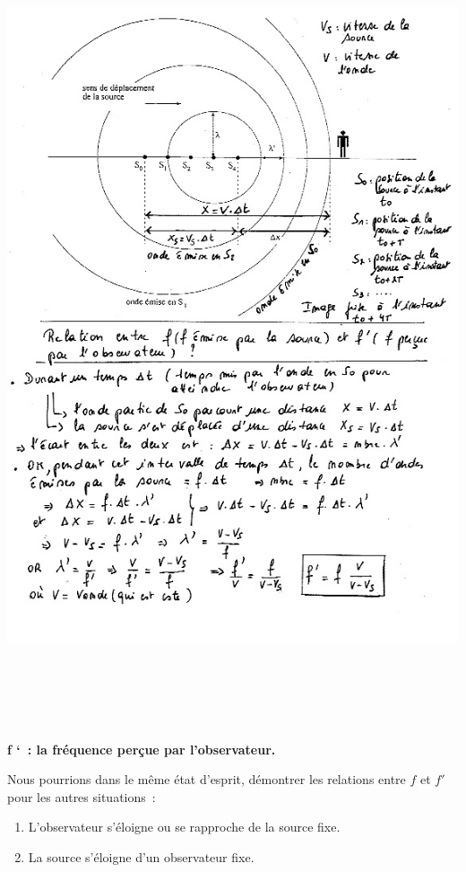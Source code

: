 \includegraphics[width=17.231cm,height=24.262cm]{Pictures/10000001000002390000032125422D51A14758E6.png}\textbf{f
`~: la fréquence perçue par l'observateur. }

Nous pourrions dans le même état d'esprit, démontrer les relations entre
$f$ et $f'$ pour les autres situations~:
\begin{enumerate}
	\item L'observateur s'éloigne ou se rapproche de la source fixe.
	\item La source s'éloigne d'un observateur fixe.
\end{enumerate}

